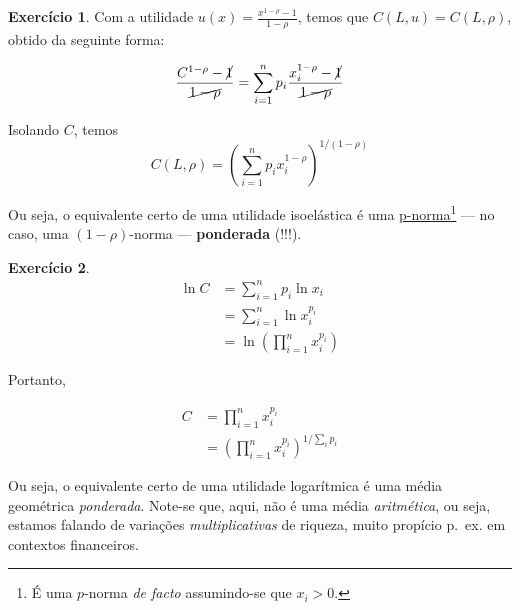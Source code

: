 \documentclass[12pt]{article}
\numberwithin{equation}{section}
\theoremstyle{plain}
\theoremstyle{definition}
\newtheorem{exercise}{Exercício}[section]
\theoremstyle{remark}
\begin{document}
\begin{exercise}
Com a utilidade \(u(x) = \frac{x^{1-\rho}-1}{1-\rho}\), temos que
\(C(L, u) = C(L, \rho)\), obtido da seguinte forma:

\begin{align*}
\frac{C^{1-\rho}-\cancel{ 1 }}{\cancel{ 1-\rho }} &= \sum \limits_{i=1}^{n} p_{i} \frac{x_{i}^{1-\rho}-\cancel{ 1 }}{\cancel{ 1-\rho }} \\
\end{align*}

Isolando \(C\), temos
\[
C(L, \rho) = \left( \sum \limits_{i=1}^{n} p_{i} x_{i}^{1-\rho} \right)^{1/(1-\rho)}
\]

Ou seja, o equivalente certo de uma utilidade isoelástica é uma
\href{https://en.wikipedia.org/wiki/Norm_(mathematics)\#p-norm}{p-norma}\footnote{É
  uma \(p\)-norma \textit{de facto} assumindo-se que \(x_{i}>0\).} ---
no caso, uma \((1-\rho)\)-norma --- \textbf{ponderada} (!!!).
\end{exercise}

\begin{exercise}
\begin{align*}
\ln C &= \sum \limits_{i=1}^{n} p_{i} \ln x_{i} \\
&= \sum \limits_{i=1}^{n} \ln x_{i}^{p_{i}} \\
&= \ln \left( \prod \limits_{i=1}^{n} x_{i}^{p_{i}} \right)
\end{align*}

Portanto,

\begin{align*}
C &= \prod \limits_{i=1}^{n} x_{i}^{p_{i}} \\
&= \left( \prod \limits_{i=1}^{n} x_{i}^{p_{i}} \right)^{1/\sum \limits_{i}p_{i}}
\end{align*}

Ou seja, o equivalente certo de uma utilidade logarítmica é uma média
geométrica \textit{ponderada}. Note-se que, aqui, não é uma média
\textit{aritmética}, ou seja, estamos falando de variações
\textit{multiplicativas} de riqueza, muito propício p.~ex. em contextos
financeiros.
\end{exercise}
\end{document}
